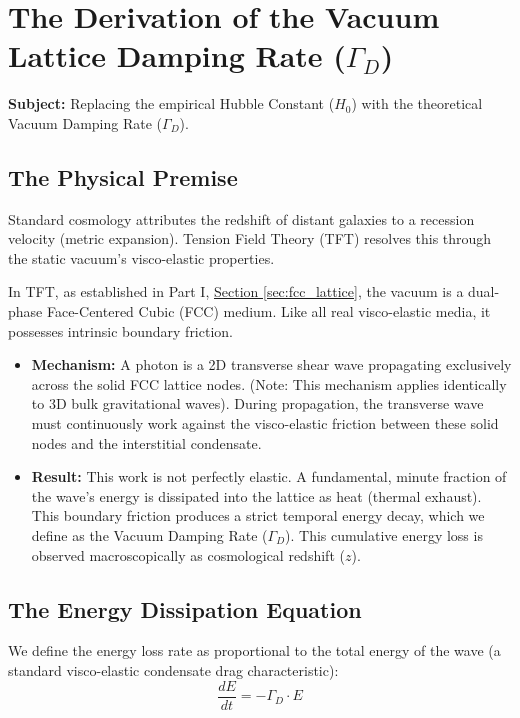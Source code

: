 \chapter{The Derivation of the Vacuum Lattice Damping Rate ($\Gamma_D$)}
\label{app:vacuum_damping}

\textbf{Subject:} Replacing the empirical Hubble Constant ($H_0$) with the theoretical Vacuum Damping Rate ($\Gamma_D$).

\section{The Physical Premise}
Standard cosmology attributes the redshift of distant galaxies to a recession velocity (metric expansion). Tension Field Theory (TFT) resolves this through the static vacuum's visco-elastic properties.

In TFT, as established in Part I, \hyperref[sec:fcc_lattice]{Section \ref*{sec:fcc_lattice}}, the vacuum is a dual-phase Face-Centered Cubic (FCC) medium. Like all real visco-elastic media, it possesses intrinsic boundary friction.

\begin{itemize}
    \item \textbf{Mechanism:} A photon is a 2D transverse shear wave propagating exclusively across the solid FCC lattice nodes. (Note: This mechanism applies identically to 3D bulk gravitational waves). During propagation, the transverse wave must continuously work against the visco-elastic friction between these solid nodes and the interstitial condensate.
    
    \item \textbf{Result:} This work is not perfectly elastic. A fundamental, minute fraction of the wave's energy is dissipated into the lattice as heat (thermal exhaust). This boundary friction produces a strict temporal energy decay, which we define as the Vacuum Damping Rate ($\Gamma_D$). This cumulative energy loss is observed macroscopically as cosmological redshift ($z$).
\end{itemize}

\section{The Energy Dissipation Equation}
We define the energy loss rate as proportional to the total energy of the wave (a standard visco-elastic condensate drag characteristic):
\[
\frac{dE}{dt} = -\Gamma_D \cdot E
\]

